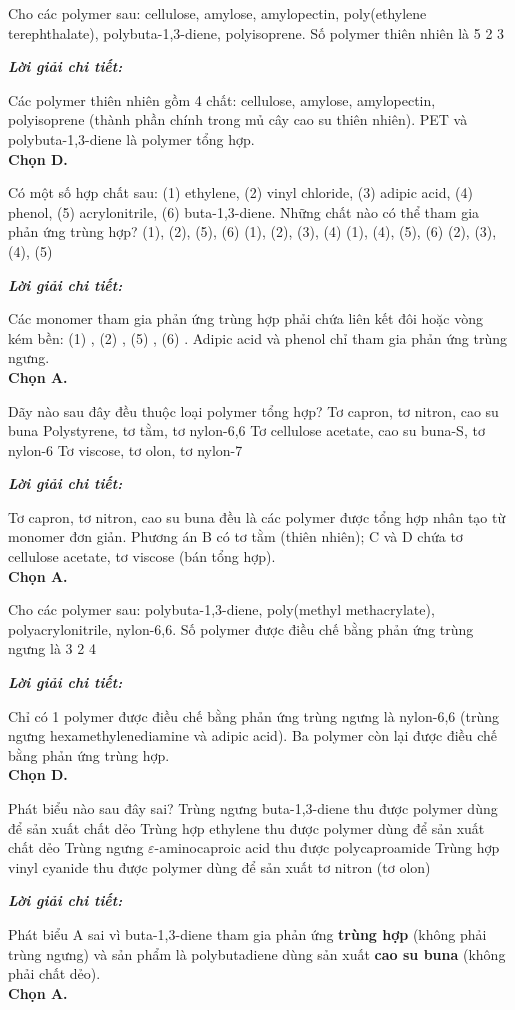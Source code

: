 \documentclass[11pt,a4paper]{article}
\def\loigiai#1{
\par\begingroup\color{blue!80!black}\small
\noindent\textbf{\textit{Lời giải chi tiết:}}\par
#1\par\endgroup}
\begin{document}
\begin{ex}
Cho các polymer sau: cellulose, amylose, amylopectin, poly(ethylene terephthalate), polybuta-1,3-diene, polyisoprene. Số polymer thiên nhiên là
\choice
{5}
{2}
{3}
{}
\loigiai{
Các polymer thiên nhiên gồm 4 chất: cellulose, amylose, amylopectin, polyisoprene (thành phần chính trong mủ cây cao su thiên nhiên). PET và polybuta-1,3-diene là polymer tổng hợp.\\
\textbf{Chọn D.}}
\end{ex}

\begin{ex}
Có một số hợp chất sau: (1) ethylene, (2) vinyl chloride, (3) adipic acid, (4) phenol, (5) acrylonitrile, (6) buta-1,3-diene. Những chất nào có thể tham gia phản ứng trùng hợp?
\choice
{\True (1), (2), (5), (6)}
{(1), (2), (3), (4)}
{(1), (4), (5), (6)}
{(2), (3), (4), (5)}
\loigiai{
Các monomer tham gia phản ứng trùng hợp phải chứa liên kết đôi \ce{C=C} hoặc vòng kém bền: (1) \ce{CH2=CH2}, (2) \ce{CH2=CHCl}, (5) \ce{CH2=CH-CN}, (6) \ce{CH2=CH-CH=CH2}. Adipic acid và phenol chỉ tham gia phản ứng trùng ngưng.\\
\textbf{Chọn A.}}
\end{ex}

\begin{ex}
Dãy nào sau đây đều thuộc loại polymer tổng hợp?
\choice
{\True Tơ capron, tơ nitron, cao su buna}
{Polystyrene, tơ tằm, tơ nylon-6,6}
{Tơ cellulose acetate, cao su buna-S, tơ nylon-6}
{Tơ viscose, tơ olon, tơ nylon-7}
\loigiai{
Tơ capron, tơ nitron, cao su buna đều là các polymer được tổng hợp nhân tạo từ monomer đơn giản. Phương án B có tơ tằm (thiên nhiên); C và D chứa tơ cellulose acetate, tơ viscose (bán tổng hợp).\\
\textbf{Chọn A.}}
\end{ex}

\begin{ex}
Cho các polymer sau: polybuta-1,3-diene, poly(methyl methacrylate), polyacrylonitrile, nylon-6,6. Số polymer được điều chế bằng phản ứng trùng ngưng là
\choice
{3}
{2}
{4}
{}
\loigiai{
Chỉ có 1 polymer được điều chế bằng phản ứng trùng ngưng là nylon-6,6 (trùng ngưng hexamethylenediamine và adipic acid). Ba polymer còn lại được điều chế bằng phản ứng trùng hợp.\\
\textbf{Chọn D.}}
\end{ex}

\begin{ex}
Phát biểu nào sau đây sai?
\choice
{\True Trùng ngưng buta-1,3-diene thu được polymer dùng để sản xuất chất dẻo}
{Trùng hợp ethylene thu được polymer dùng để sản xuất chất dẻo}
{Trùng ngưng $\varepsilon$-aminocaproic acid thu được polycaproamide}
{Trùng hợp vinyl cyanide thu được polymer dùng để sản xuất tơ nitron (tơ olon)}
\loigiai{
Phát biểu A sai vì buta-1,3-diene tham gia phản ứng \textbf{trùng hợp} (không phải trùng ngưng) và sản phẩm là polybutadiene dùng sản xuất \textbf{cao su buna} (không phải chất dẻo).\\
\textbf{Chọn A.}}
\end{ex}
\end{document}
